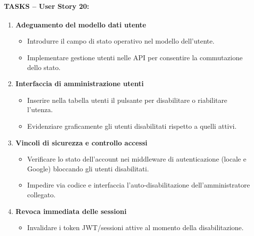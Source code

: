 \paragraph*{TASKS – User Story 20:}
\begin{enumerate}
    \item \textbf{Adeguamento del modello dati utente}
    \begin{itemize}
        \item Introdurre il campo di stato operativo nel modello dell'utente.
        \item Implementare gestione utenti nelle API per consentire la commutazione dello stato.
    \end{itemize}
    \item \textbf{Interfaccia di amministrazione utenti}
    \begin{itemize}
        \item Inserire nella tabella utenti il pulsante per disabilitare o riabilitare l'utenza.
        \item Evidenziare graficamente gli utenti disabilitati rispetto a quelli attivi.
    \end{itemize}
    \item \textbf{Vincoli di sicurezza e controllo accessi}
    \begin{itemize}
        \item Verificare lo stato dell'account nei middleware di autenticazione (locale e Google) bloccando gli utenti disabilitati.
        \item Impedire via codice e interfaccia l'auto-disabilitazione dell'amministratore collegato.
    \end{itemize}
    \item \textbf{Revoca immediata delle sessioni}
    \begin{itemize}
        \item Invalidare i token JWT/sessioni attive al momento della disabilitazione.
    \end{itemize}
\end{enumerate}